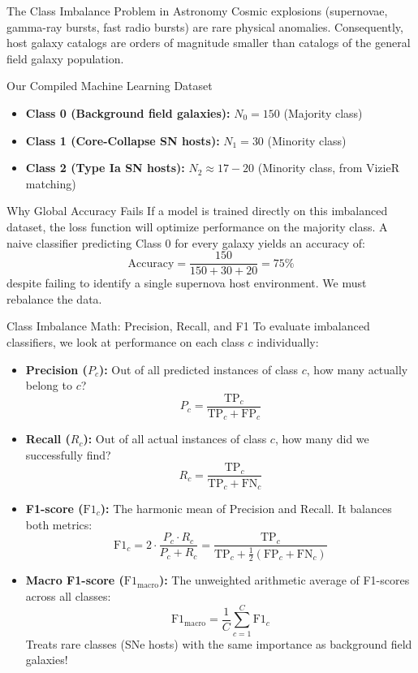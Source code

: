 \documentclass[9pt]{beamer}
\begin{document}
\begin{frame}{The Class Imbalance Problem in Astronomy}
  Cosmic explosions (supernovae, gamma-ray bursts, fast radio bursts) are rare physical anomalies. Consequently, host galaxy catalogs are orders of magnitude smaller than catalogs of the general field galaxy population.
  \begin{block}{Our Compiled Machine Learning Dataset}
    \begin{itemize}
      \item \textbf{Class 0 (Background field galaxies):} $N_0 = 150$ (Majority class)
      \item \textbf{Class 1 (Core-Collapse SN hosts):} $N_1 = 30$ (Minority class)
      \item \textbf{Class 2 (Type Ia SN hosts):} $N_2 \approx 17-20$ (Minority class, from VizieR matching)
    \end{itemize}
  \end{block}
  \begin{alertblock}{Why Global Accuracy Fails}
    If a model is trained directly on this imbalanced dataset, the loss function will optimize performance on the majority class. A naive classifier predicting Class 0 for every galaxy yields an accuracy of:
    $$\text{Accuracy} = \frac{150}{150 + 30 + 20} = 75\%$$
    despite failing to identify a single supernova host environment. We must rebalance the data.
  \end{alertblock}
\end{frame}

\begin{frame}{Class Imbalance Math: Precision, Recall, and F1}
  To evaluate imbalanced classifiers, we look at performance on each class $c$ individually:
  \begin{itemize}
    \item \textbf{Precision ($P_c$):} Out of all predicted instances of class $c$, how many actually belong to $c$?
      $$P_c = \frac{\text{TP}_c}{\text{TP}_c + \text{FP}_c}$$
    \item \textbf{Recall ($R_c$):} Out of all actual instances of class $c$, how many did we successfully find?
      $$R_c = \frac{\text{TP}_c}{\text{TP}_c + \text{FN}_c}$$
    \item \textbf{F1-score ($\text{F1}_c$):} The harmonic mean of Precision and Recall. It balances both metrics:
      $$\text{F1}_c = 2 \cdot \frac{P_c \cdot R_c}{P_c + R_c} = \frac{\text{TP}_c}{\text{TP}_c + \frac{1}{2}(\text{FP}_c + \text{FN}_c)}$$
    \item \textbf{Macro F1-score ($\text{F1}_{\text{macro}}$):} The unweighted arithmetic average of F1-scores across all classes:
      $$\text{F1}_{\text{macro}} = \frac{1}{C} \sum_{c=1}^C \text{F1}_c$$
      Treats rare classes (SNe hosts) with the same importance as background field galaxies!
  \end{itemize}
\end{frame}
\end{document}
